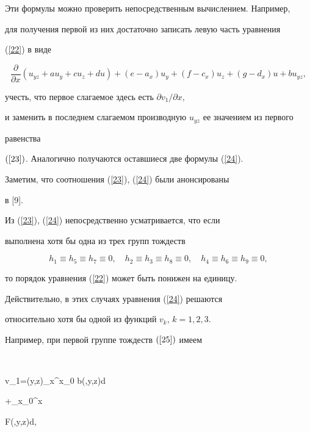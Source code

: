 Эти формулы можно проверить непосредственным вычислением. Например,


для получения первой из них достаточно записать левую часть уравнения


(\ref{22}) в виде


$$


\frac{\partial}{\partial x} (u_{yz}+au_{y}+cu_{z}+du)


+(e-a_{x})u_{y}+(f-c_{x})u_{z}+(g-d_{x})u+bu_{yz},


$$


учесть, что первое слагаемое здесь есть $\partial v_{1}/\partial x$,


и заменить в последнем слагаемом производную $u_{yz}$ ее значением из первого


равенства


$(\ref{23})$. Аналогично получаются оставшиеся две формулы (\ref{24}).





Заметим, что соотношения (\ref{23}), (\ref{24}) были анонсированы


в [9].





Из (\ref{23}), (\ref{24}) непосредственно усматривается, что если


выполнена хотя бы одна из трех групп тождеств


\begin{equation}\label{25}


h_{1}\equiv h_{5}\equiv h_{7}\equiv 0,\quad


h_{2}\equiv h_{3}\equiv h_{8}\equiv 0,\quad


h_{4}\equiv h_{6}\equiv h_{9}\equiv0,


\end{equation}


то порядок уравнения (\ref{22}) может быть понижен на единицу.


Действительно, в этих случаях уравнения (\ref{24}) решаются


относительно хотя бы одной из функций $v_{k}$, $k=1,2,3$.


Например, при первой группе тождеств $(\ref{25})$ имеем


$$


v_{1}=\omega(y,z)\exp\int_{x}^{x_{0}} b(\xi,y,z)d\xi


+\int_{x_{0}}^{x} 


F(\xi,y,z)d\xi,


